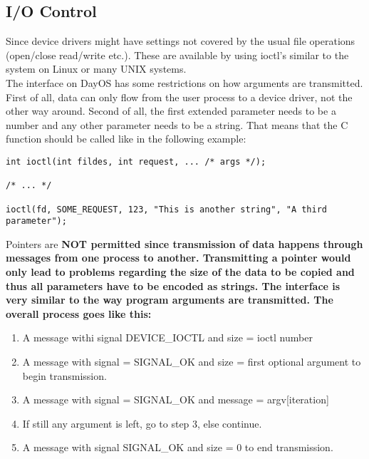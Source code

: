 \subsection{I/O Control}
Since device drivers might have settings not covered by the usual file operations (open/close read/write etc.).
These are available by using ioctl's similar to the system on Linux or many UNIX systems. \\
The interface on DayOS has some restrictions on how arguments are transmitted.
First of all, data can only flow from the user process to a device driver, not the other way around.
Second of all, the first extended parameter needs to be a number
and any other parameter needs to be a string. That means that the C function should be called
like in the following example:
\begin{verbatim}
int ioctl(int fildes, int request, ... /* args */);

/* ... */

ioctl(fd, SOME_REQUEST, 123, "This is another string", "A third parameter");
\end{verbatim}
Pointers are \bf{NOT} permitted since transmission of data happens through messages
from one process to another. Transmitting a pointer would only lead to problems regarding
the size of the data to be copied and thus all parameters have to be encoded as strings.
The interface is very similar to the way program arguments are transmitted.
The overall process goes like this:
\begin{enumerate}
 \item A message withi signal DEVICE\_IOCTL and size = ioctl number
 \item A message with signal = SIGNAL\_OK and size = first optional argument to begin transmission.
 \item A message with signal = SIGNAL\_OK and message = argv[iteration]
 \item If still any argument is left, go to step 3, else continue.
 \item A message with signal SIGNAL\_OK and size = 0 to end transmission.
\end{enumerate}